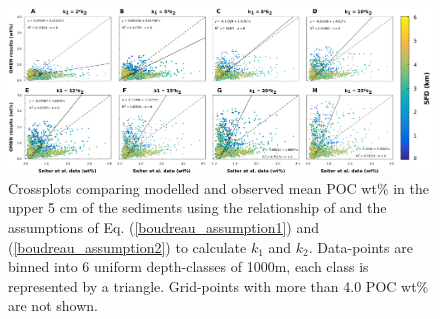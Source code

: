 \documentclass[gmd, manuscript]{copernicus}
\begin{document}
\begin{figure}[htbp]
\begin{center}
	\includegraphics[width=1.0\textwidth]{figures/OMEN-GENIE-Exp/0_Boudreau_CROSSPLOTS_290817_noDEPTHDEP.pdf}
	\caption{Crossplots comparing modelled and observed mean POC wt\% in the upper 5 cm of the sediments using the relationship of \citet{boudreau1997diagenetic} and the assumptions of Eq. (\ref{boudreau_assumption1}) and 
	(\ref{boudreau_assumption2}) to calculate $k_1$ and $k_2$.  Data-points are binned into 6 uniform depth-classes of 1000m, each class is represented by a triangle. 
	Grid-points with more than 4.0 POC wt\% are not shown.}
	\label{fig:OMEN_GENIE_Boudreau_results}
\end{center}
\end{figure}
\end{document}
